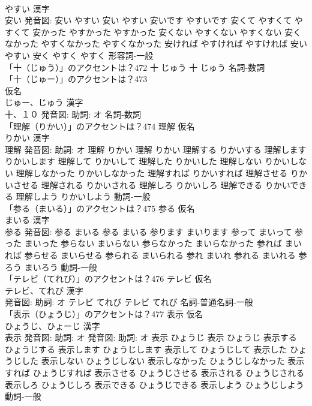 \documentclass[8pt]{extreport}
\begin{document}
\begin{CJK}{UTF8}{min}
\\	やすい 漢字　
\\	安い 発音図:	安い やすい		安い やすい 安いです やすいです 安くて やすくて やすくて 安かった やすかった やすかった 安くない やすくない やすくない 安くなかった やすくなかった やすくなかった 安ければ やすければ やすければ 安い やすい 安く やすく やすく				形容詞-一般 
\\	「十（じゅう）」のアクセントは？472		十 じゅう		十 じゅう				名詞-数詞 
\\	「十（じゅー）」のアクセントは？473	
\\	仮名　
\\	じゅー、じゅう 漢字　
\\	十、１０ 発音図: 助詞: オ							名詞-数詞 
\\	「理解（りかい）」のアクセントは？474	理解 仮名　
\\	りかい 漢字　
\\	理解 発音図: 助詞: オ	理解 りかい		理解 りかい 理解する りかいする 理解します りかいします 理解して りかいして 理解した りかいした 理解しない りかいしない 理解しなかった りかいしなかった 理解すれば りかいすれば 理解させる りかいさせる 理解される りかいされる 理解しろ りかいしろ 理解できる りかいできる 理解しよう りかいしよう				動詞-一般 
\\	「参る（まいる）」のアクセントは？475	参る 仮名　
\\	まいる 漢字　
\\	参る 発音図:	参る まいる		参る まいる 参ります まいります 参って まいって 参った まいった 参らない まいらない 参らなかった まいらなかった 参れば まいれば 参らせる まいらせる 参られる まいられる 参れ まいれ 参れる まいれる 参ろう まいろう				動詞-一般 
\\	「テレビ（てれび）」のアクセントは？476	テレビ 仮名　
\\	テレビ、てれび 漢字　
\\	発音図: 助詞: オ	テレビ てれび		テレビ てれび				名詞-普通名詞-一般 
\\	「表示（ひょうじ）」のアクセントは？477	表示 仮名　
\\	ひょうじ、ひょーじ 漢字　
\\	表示 発音図: 助詞: オ 発音図: 助詞: オ	表示 ひょうじ		表示 ひょうじ 表示する ひょうじする 表示します ひょうじします 表示して ひょうじして 表示した ひょうじした 表示しない ひょうじしない 表示しなかった ひょうじしなかった 表示すれば ひょうじすれば 表示させる ひょうじさせる 表示される ひょうじされる 表示しろ ひょうじしろ 表示できる ひょうじできる 表示しよう ひょうじしよう				動詞-一般 

\end{CJK}
\end{document}
